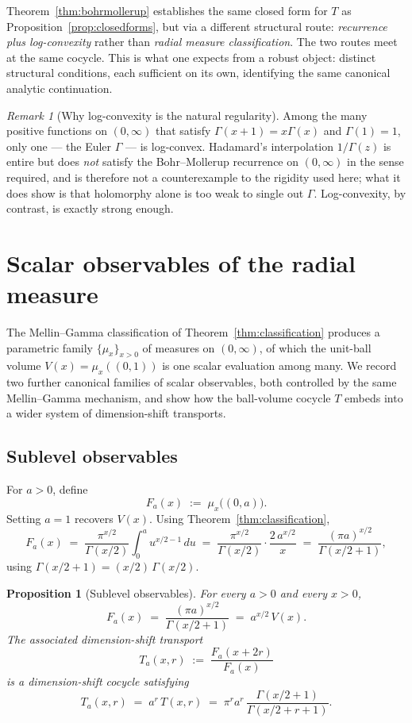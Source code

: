 \documentclass[11pt,a4paper]{article}
\theoremstyle{plain}
\newtheorem{proposition}[theorem]{Proposition}
\theoremstyle{definition}
\theoremstyle{remark}
\newtheorem{remark}[theorem]{Remark}
\begin{document}
Theorem~\ref{thm:bohrmollerup} establishes the same closed form for $T$ as Proposition~\ref{prop:closedforms}, but via a different structural route: \emph{recurrence plus log-convexity} rather than \emph{radial measure classification}. The two routes meet at the same cocycle. This is what one expects from a robust object: distinct structural conditions, each sufficient on its own, identifying the same canonical analytic continuation.

\begin{remark}[Why log-convexity is the natural regularity]
Among the many positive functions on $(0,\infty)$ that satisfy $\Gamma(x+1)=x\Gamma(x)$ and $\Gamma(1)=1$, only one — the Euler $\Gamma$ — is log-convex. Hadamard's interpolation $1/\Gamma(z)$ is entire but does \emph{not} satisfy the Bohr--Mollerup recurrence on $(0,\infty)$ in the sense required, and is therefore not a counterexample to the rigidity used here; what it does show is that holomorphy alone is too weak to single out $\Gamma$. Log-convexity, by contrast, is exactly strong enough.
\end{remark}

\section{Scalar observables of the radial measure}\label{sec:observables}

The Mellin--Gamma classification of Theorem~\ref{thm:classification} produces a parametric family $\{\mu_x\}_{x>0}$ of measures on $(0,\infty)$, of which the unit-ball volume $V(x) = \mu_x((0,1))$ is one scalar evaluation among many. We record two further canonical families of scalar observables, both controlled by the same Mellin--Gamma mechanism, and show how the ball-volume cocycle $T$ embeds into a wider system of dimension-shift transports.

\subsection*{Sublevel observables}

For $a>0$, define
\[
F_a(x) \;:=\; \mu_x\bigl((0,a)\bigr).
\]
Setting $a=1$ recovers $V(x)$. Using Theorem~\ref{thm:classification},
\[
F_a(x) \;=\; \frac{\pi^{x/2}}{\Gamma(x/2)}\int_0^a u^{x/2-1}\,du \;=\; \frac{\pi^{x/2}}{\Gamma(x/2)}\cdot\frac{2\,a^{x/2}}{x} \;=\; \frac{(\pi a)^{x/2}}{\Gamma(x/2+1)},
\]
using $\Gamma(x/2+1) = (x/2)\,\Gamma(x/2)$.

\begin{proposition}[Sublevel observables]\label{prop:sublevel}
For every $a>0$ and every $x>0$,
\[
F_a(x) \;=\; \frac{(\pi a)^{x/2}}{\Gamma(x/2+1)} \;=\; a^{x/2}\,V(x).
\]
The associated dimension-shift transport
\[
T_a(x,r) \;:=\; \frac{F_a(x+2r)}{F_a(x)}
\]
is a dimension-shift cocycle satisfying
\[
T_a(x,r) \;=\; a^{r}\,T(x,r) \;=\; \pi^r a^r\,\frac{\Gamma(x/2+1)}{\Gamma(x/2+r+1)}.
\]
\end{proposition}
\end{document}
